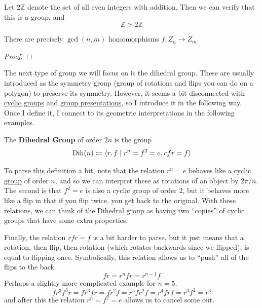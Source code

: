   \begin{example}
    \label{ex:integers-to-even-integers}
    Let $2 \mathbb{Z}$ denote the set of all even integers with addition. Then we can verify that this is a group, and 
    \begin{equation}
      \mathbb{Z} \simeq 2 \mathbb{Z}
    \end{equation}
  \end{example}

  \begin{theorem}
    \label{thm:homomorphisms-between-cyclic-groups}
    There are precisely $\gcd(n, m)$ homomorphisms $f: Z_n \to Z_m$. 
  \end{theorem}
  \begin{proof}
    
  \end{proof}

  The next type of group we will focus on is the dihedral group. These are usually introduced as the symmetry group (group of rotations and flips you can do on a polygon) to preserve its symmetry. However, it seems a bit disconnected with \hyperref[def:cyclic-group]{cyclic groups} and \hyperref[def:group-presentations]{group presentations}, so I introduce it in the following way. Once I define it, I connect to its geometric interpretations in the following examples. 

  \begin{definition}
    \label{def:dihedral-group}
    The \textbf{Dihedral Group} of order $2n$ is the group 
    \begin{equation}
      \operatorname{Dih}(n) \coloneqq \langle r, f \mid r^n = f^2 = e, rfr = f  \rangle
    \end{equation}
  \end{definition}

  To parse this definition a bit, note that the relation $r^n = e$ behaves like a \hyperref[def:cyclic-group]{cyclic group} of order $n$, and so we can interpret these as rotations of an object by $2\pi/n$. The second is that $f^2 = e$ is also a cyclic group of order $2$, but it behaves more like a flip in that if you flip twice, you get back to the original. With these relations, we can think of the \hyperref[def:dihedral-group]{Dihedral group} as having two ``copies'' of cyclic groups that have some extra properties. 

  Finally, the relation $rfr = f$ is a bit harder to parse, but it just means that a rotation, then flip, then rotation (which rotates backwards since we flipped), is equal to flipping once. Symbolically, this relation allows us to ``push'' all of the flips to the back. 
  \begin{equation} 
    f r = r^n f r = r^{n-1} f
  \end{equation}
  Perhaps a slightly more complicated example for $n = 5$. 
  \begin{equation}
    f r^3 f^3 r = f r^3 f r = f r^2 f = r^5 f r^2 f = r^4 f r f = r^3 f^2 = r^3
  \end{equation}
  and after this the relation $r^n = f^2 = e$ allows us to cancel some out. 

